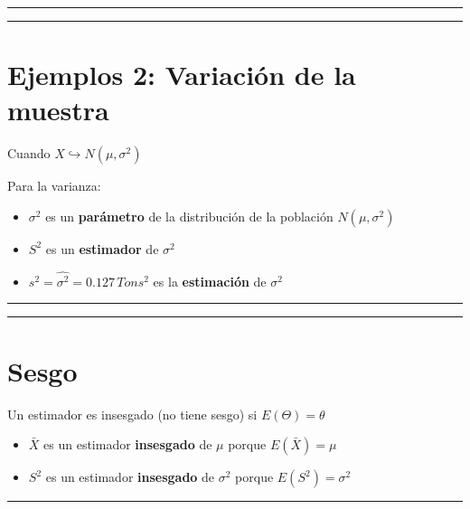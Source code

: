 \documentclass[
]{book}
\providecommand{\tightlist}{%
  \setlength{\itemsep}{0pt}\setlength{\parskip}{0pt}}
\begin{document}
\begin{center}\rule{0.5\linewidth}{0.5pt}\end{center}

\begin{center}\rule{0.5\linewidth}{0.5pt}\end{center}

\hypertarget{ejemplos-2-variaciuxf3n-de-la-muestra}{%
\section{Ejemplos 2: Variación de la muestra}\label{ejemplos-2-variaciuxf3n-de-la-muestra}}

Cuando \(X \hookrightarrow N(\mu, \sigma^2)\)

Para la varianza:

\begin{itemize}
\tightlist
\item
  \(\sigma^2\) es un \textbf{parámetro} de la distribución de la población \(N(\mu, \sigma^2)\)
\item
  \(S^2\) es un \textbf{estimador} de \(\sigma^2\)
\item
  \(s^2=\hat{\sigma^2}=0.127 \, Tons^2\) es la \textbf{estimación} de \(\sigma^2\)
\end{itemize}

\begin{center}\rule{0.5\linewidth}{0.5pt}\end{center}

\begin{center}\rule{0.5\linewidth}{0.5pt}\end{center}

\hypertarget{sesgo}{%
\section{Sesgo}\label{sesgo}}

Un estimador es insesgado (no tiene sesgo) si \(E(\Theta)=\theta\)

\begin{itemize}
\item
  \(\bar{X}\) es un estimador \textbf{insesgado} de \(\mu\) porque \(E(\bar{X})=\mu\)
\item
  \(S^2\) es un estimador \textbf{insesgado} de \(\sigma^2\) porque \(E(S^2)=\sigma^2\)
\end{itemize}

\begin{center}\rule{0.5\linewidth}{0.5pt}\end{center}
\end{document}
